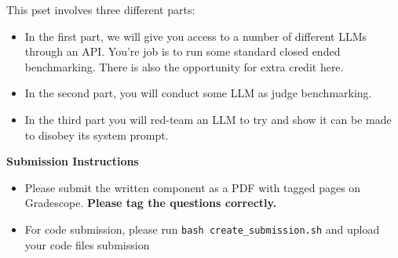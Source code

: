 \documentclass[answers]{exam}
\begin{document}
This pset involves three different parts:

\begin{itemize}
    \item In the first part, we will give you access 
    to a number of different LLMs through an API. You're 
    job is to run some standard closed 
    ended benchmarking. There is also the opportunity for 
    extra credit here.
    \item In the second part, you will conduct 
    some LLM as judge benchmarking.
    \item In the third part you will red-team an LLM 
    to try and show it can be made to disobey its system prompt.
\end{itemize}

\newpage

\begin{questions}
    
    
    
    \newpage
    
    
    
    \newpage 
    
    
    
    \newpage
    
\end{questions}

\Large{\textbf{Submission Instructions}}


\normalsize

\begin{itemize}
    \item Please submit the written component as a PDF with tagged pages on Gradescope. \textbf{Please tag the questions correctly.}
    \item For code submission, please run \texttt{bash create\_submission.sh} and upload your code files submission 
\end{itemize}
\end{document}

